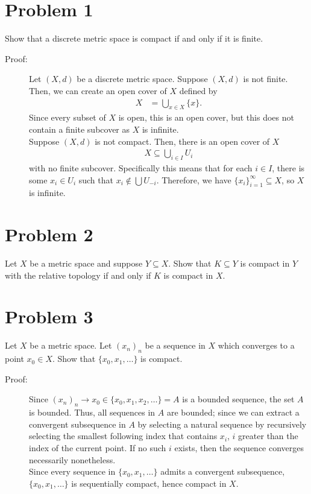 \documentclass[10pt]{extarticle}
\title{}
\author{}
\date{}
\begin{document}
  \section{Problem 1}%
  Show that a discrete metric space is compact if and only if it is finite.
  \begin{description}
    \item[Proof:] Let $(X,d)$ be a discrete metric space. Suppose $(X,d)$ is not finite. Then, we can create an open cover of $X$ defined by
      \begin{align*}
        X &= \bigcup_{x\in X}\{x\}.
      \end{align*}
      Since every subset of $X$ is open, this is an open cover, but this does not contain a finite subcover as $X$ is infinite.\\

      Suppose $(X,d)$ is not compact. Then, there is an open cover of $X$
      \begin{align*}
        X \subseteq \bigcup_{i\in I} U_i
      \end{align*}
      with no finite subcover. Specifically this means that for each $i\in I$, there is some $x_{i}\in U_i$ such that $x_{i}\notin \bigcup U_{-i}$. Therefore, we have $\{x_i\}_{i=1}^{\infty}\subseteq X$, so $X$ is infinite.
  \end{description}
  \section{Problem 2}%
  Let $X$ be a metric space and suppose $Y\subseteq X$. Show that $K\subseteq Y$ is compact in $Y$ with the relative topology if and only if $K$ is compact in $X$.
  \section{Problem 3}%
  Let $X$ be a metric space. Let $(x_n)_n$ be a sequence in $X$ which converges to a point $x_0\in X$. Show that $\{x_0,x_1,\dots\}$ is compact.
  \begin{description}
    \item[Proof:] Since $(x_n)_n\rightarrow x_0\in \{x_0,x_1,x_2,\dots\} = A$ is a bounded sequence, the set $A$ is bounded. Thus, all sequences in $A$ are bounded; since we can extract a convergent subsequence in $A$ by selecting a natural sequence by recursively selecting the smallest following index that contains $x_{i}$, $i$ greater than the index of the current point. If no such $i$ exists, then the sequence converges necessarily nonetheless.\\

      Since every sequence in $\{x_0,x_1,\dots\}$ admits a convergent subsequence, $\{x_0,x_1,\dots\}$ is sequentially compact, hence compact in $X$.
  \end{description}
\end{document}
